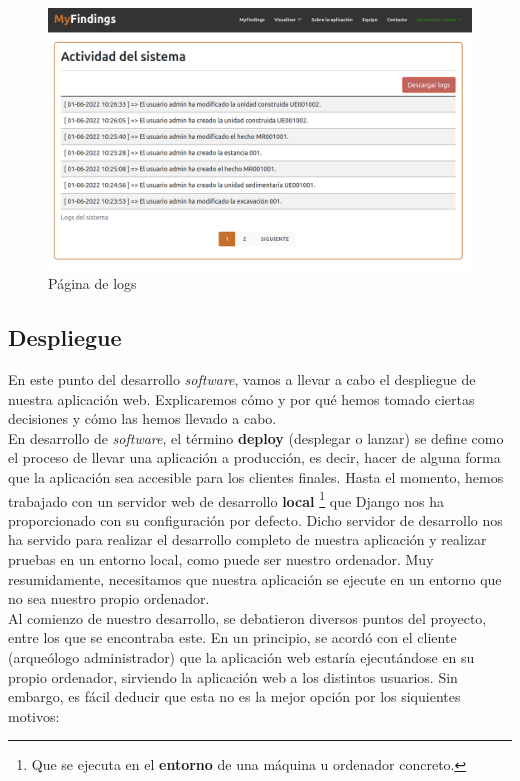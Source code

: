 \begin{enumerate}
            \begin{figure}[H]
                \centering
                \includegraphics[scale=0.20]{imagenes/logs.png}
                \caption{Página de logs}
                \label{fig:log-template}
            \end{figure}

    \end{enumerate}

\subsection{Despliegue}
En este punto del desarrollo \textit{software}, vamos a llevar a cabo el despliegue de
nuestra aplicación web. Explicaremos cómo y por qué hemos tomado ciertas decisiones
y cómo las hemos llevado a cabo. \\

En desarrollo de \textit{software}, el término \textbf{deploy} (desplegar o lanzar)
\cite{deploy} se define como el proceso de llevar una aplicación a producción, es decir,
hacer de alguna forma que la aplicación sea accesible para los clientes finales. Hasta el
momento, hemos trabajado con un servidor web de desarrollo \textbf{local} \footnote{Que se
ejecuta en el \textbf{entorno} de una máquina u ordenador concreto.} que Django nos ha
proporcionado con su configuración por defecto. Dicho servidor de desarrollo nos ha servido
para realizar el desarrollo completo de nuestra aplicación y realizar pruebas en un entorno
local, como puede ser nuestro ordenador. Muy resumidamente, necesitamos que nuestra
aplicación se ejecute en un entorno que no sea nuestro propio ordenador. \\

Al comienzo de nuestro desarrollo, se debatieron diversos puntos del proyecto, entre los
que se encontraba este. En un principio, se acordó con el cliente (arqueólogo administrador)
que la aplicación web estaría ejecutándose en su propio ordenador, sirviendo la aplicación
web a los distintos usuarios. Sin embargo, es fácil deducir que esta no es la mejor opción por
los siquientes motivos:

